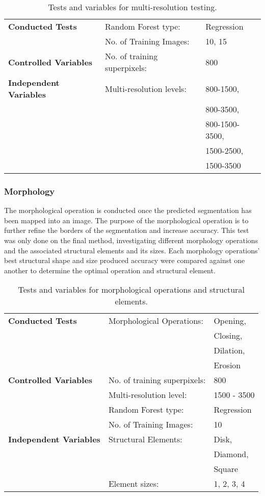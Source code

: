 \begin{table}[H]
\centering
\caption{Tests and variables for multi-resolution testing.}

\begin{tabular}{|l|ll|}
\hline
\textbf{Conducted Tests}	& Random Forest type: & Regression\\	
	&  No. of Training Images: & 10, 15\\
	
\hline
\textbf{Controlled Variables} & No. of training superpixels: & 800 \\
\hline
\textbf{Independent Variables} & Multi-resolution levels:& 800-1500, \\
	& 	& 800-3500,\\
	&	& 800-1500-3500,\\
	&	& 1500-2500,\\
	&	& 1500-3500\\
\hline				    	 			   			    	 
\end{tabular}
\label{table:multires}
\end{table}

\subsubsection{Morphology}
The morphological operation is conducted once the predicted segmentation has been mapped into an image. The purpose of the morphological operation is to further refine the borders of the segmentation and increase accuracy. This test was only done on the final method, investigating different morphology operations and the associated structural elements and its sizes. Each morphology operations' best structural shape and size produced accuracy were compared against one another to determine the optimal operation and structural element.

\begin{table}[H]
\centering
\caption{Tests and variables for morphological operations and structural elements.}

\begin{tabular}{|l|ll|}
\hline
\textbf{Conducted Tests}	 & Morphological Operations: & Opening,\\
	& 	& Closing,\\ 
	&	& Dilation,\\
	&	& Erosion\\
\hline
\textbf{Controlled Variables} & No. of training superpixels: & 800 \\
	 & Multi-resolution level: & 1500 - 3500\\
	 & Random Forest type: & Regression\\	
	 &  No. of Training Images: & 10\\
\hline
\textbf{Independent Variables} & Structural Elements: & Disk, \\
	& 	& Diamond,\\
	&	& Square\\
	& Element sizes: & 1, 2, 3, 4\\
\hline				    	 			   			    	 
\end{tabular}
\label{table:morphtest}
\end{table}

